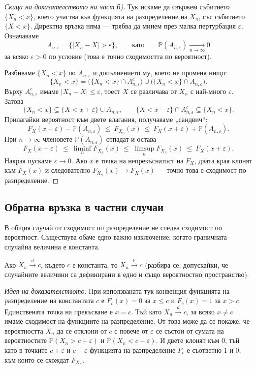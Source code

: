 \begin{proof}[Скица на доказателството на част б)]
Тук искаме да свържем събитието $\{X_n < x\}$, което участва във функцията на разпределение
на $X_n$, със събитието $\{X < x\}$. Директна връзка няма — трябва да минем през малка
пертурбация $\varepsilon$. Означаваме
\[
A_{n,\varepsilon} = \{ |X_n - X| > \varepsilon \},
\qquad\text{като}\qquad
\mathbb{P}(A_{n,\varepsilon}) \xrightarrow[n \to \infty]{} 0
\]
за всяко $\varepsilon > 0$ по условие (това е точно сходимостта по вероятност).

Разбиваме $\{X_n < x\}$ по $A_{n,\varepsilon}$ и допълнението му, което не променя нищо:
\[
\{X_n < x\} = \big(\{X_n < x\} \cap A_{n,\varepsilon}^c\big) \cup \big(\{X_n < x\} \cap A_{n,\varepsilon}\big).
\]
Върху $A_{n,\varepsilon}^c$ имаме $|X_n - X| \le \varepsilon$, тоест $X$ се различава от $X_n$ с
най-много $\varepsilon$. Затова
\[
\{X_n < x\} \subseteq \{X < x + \varepsilon\} \cup A_{n,\varepsilon},
\qquad
\{X < x - \varepsilon\} \cap A_{n,\varepsilon}^c \subseteq \{X_n < x\}.
\]
Прилагайки вероятност към двете влагания, получаваме „сандвич“:
\[
F_X(x-\varepsilon) - \mathbb{P}(A_{n,\varepsilon})
\ \le\ F_{X_n}(x) \ \le\
F_X(x+\varepsilon) + \mathbb{P}(A_{n,\varepsilon}).
\]
При $n \to \infty$ членовете $\mathbb{P}(A_{n,\varepsilon})$ отпадат и остава
\[
F_X(x-\varepsilon) \ \le\ \liminf_n F_{X_n}(x) \ \le\ \limsup_n F_{X_n}(x) \ \le\ F_X(x+\varepsilon).
\]
Накрая пускаме $\varepsilon \to 0$. Ако $x$ е точка на непрекъснатост на $F_X$, двата края
клонят към $F_X(x)$ и следователно $F_{X_n}(x) \to F_X(x)$ — точно това е сходимост по
разпределение.

\end{proof}

\subsection{Обратна връзка в частни случаи}
В общия случай от сходимост по разпределение не следва сходимост по вероятност. Съществува обаче едно важно изключение: когато граничната случайна величина е константа.

\begin{prop}
Ако $X_n \xrightarrow{d} c$, където $c$ е константа, то $X_n \xrightarrow{\mathbb{P}} c$ (разбира се, допускайки, че случайните величини са дефинирани в едно и също вероятностно пространство).
\end{prop}

\emph{Идея на доказателството:} При използваната тук конвенция функцията на разпределение на константата $c$ е $F_c(x) = 0$ за $x \le c$ и $F_c(x) = 1$ за $x > c$. Единствената точка на прекъсване е $x=c$. Тъй като $X_n \xrightarrow{d} c$, за всяко $x \neq c$ имаме сходимост на функциите на разпределение. От това може да се покаже, че вероятността $X_n$ да се отклони от $c$ с повече от $\varepsilon$ се състои от сумата на вероятностите $\mathbb{P}(X_n > c + \varepsilon)$ и $\mathbb{P}(X_n < c - \varepsilon)$. И двете клонят към 0, тъй като в точките $c+\varepsilon$ и $c-\varepsilon$ функцията на разпределение $F_c$ е съответно 1 и 0, към които се схождат $F_{X_n}$.

